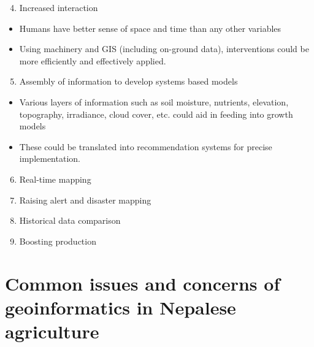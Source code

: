 \documentclass[11pt,dvipsnames,ignorenonframetext,aspectratio=169]{beamer}
\providecommand{\tightlist}{%
  \setlength{\itemsep}{0pt}\setlength{\parskip}{0pt}}
\begin{document}
\begin{frame}{}
\protect\hypertarget{section-7}{}
\begin{enumerate}
\setcounter{enumi}{3}
\tightlist
\item
  Increased interaction
\end{enumerate}

\begin{itemize}
\tightlist
\item
  Humans have better sense of space and time than any other variables
\item
  Using machinery and GIS (including on-ground data), interventions
  could be more efficiently and effectively applied.
\end{itemize}

\begin{enumerate}
\setcounter{enumi}{4}
\tightlist
\item
  Assembly of information to develop systems based models
\end{enumerate}

\begin{itemize}
\tightlist
\item
  Various layers of information such as soil moisture, nutrients,
  elevation, topography, irradiance, cloud cover, etc. could aid in
  feeding into growth models
\item
  These could be translated into recommendation systems for precise
  implementation.
\end{itemize}
\end{frame}

\begin{frame}{}
\protect\hypertarget{section-8}{}
\begin{enumerate}
\setcounter{enumi}{5}
\tightlist
\item
  Real-time mapping
\item
  Raising alert and disaster mapping
\item
  Historical data comparison
\item
  Boosting production
\end{enumerate}
\end{frame}

\hypertarget{common-issues-and-concerns-of-geoinformatics-in-nepalese-agriculture}{%
\section{Common issues and concerns of geoinformatics in Nepalese
agriculture}\label{common-issues-and-concerns-of-geoinformatics-in-nepalese-agriculture}}
\end{document}
